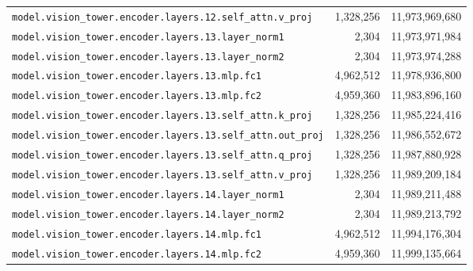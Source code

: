 \documentclass[10pt,a4paper]{article}
\theoremstyle{definition}
\begin{document}
\begin{appendices}
\begin{longtable}{p{9.5cm}rr}
\texttt{model.\allowbreak{}vision\_tower.\allowbreak{}encoder.\allowbreak{}layers.\allowbreak{}12.\allowbreak{}self\_attn.\allowbreak{}v\_proj} & 1,328,256 & 11,973,969,680 \\
\texttt{model.\allowbreak{}vision\_tower.\allowbreak{}encoder.\allowbreak{}layers.\allowbreak{}13.\allowbreak{}layer\_norm1} & 2,304 & 11,973,971,984 \\
\texttt{model.\allowbreak{}vision\_tower.\allowbreak{}encoder.\allowbreak{}layers.\allowbreak{}13.\allowbreak{}layer\_norm2} & 2,304 & 11,973,974,288 \\
\texttt{model.\allowbreak{}vision\_tower.\allowbreak{}encoder.\allowbreak{}layers.\allowbreak{}13.\allowbreak{}mlp.\allowbreak{}fc1} & 4,962,512 & 11,978,936,800 \\
\texttt{model.\allowbreak{}vision\_tower.\allowbreak{}encoder.\allowbreak{}layers.\allowbreak{}13.\allowbreak{}mlp.\allowbreak{}fc2} & 4,959,360 & 11,983,896,160 \\
\texttt{model.\allowbreak{}vision\_tower.\allowbreak{}encoder.\allowbreak{}layers.\allowbreak{}13.\allowbreak{}self\_attn.\allowbreak{}k\_proj} & 1,328,256 & 11,985,224,416 \\
\texttt{model.\allowbreak{}vision\_tower.\allowbreak{}encoder.\allowbreak{}layers.\allowbreak{}13.\allowbreak{}self\_attn.\allowbreak{}out\_proj} & 1,328,256 & 11,986,552,672 \\
\texttt{model.\allowbreak{}vision\_tower.\allowbreak{}encoder.\allowbreak{}layers.\allowbreak{}13.\allowbreak{}self\_attn.\allowbreak{}q\_proj} & 1,328,256 & 11,987,880,928 \\
\texttt{model.\allowbreak{}vision\_tower.\allowbreak{}encoder.\allowbreak{}layers.\allowbreak{}13.\allowbreak{}self\_attn.\allowbreak{}v\_proj} & 1,328,256 & 11,989,209,184 \\
\texttt{model.\allowbreak{}vision\_tower.\allowbreak{}encoder.\allowbreak{}layers.\allowbreak{}14.\allowbreak{}layer\_norm1} & 2,304 & 11,989,211,488 \\
\texttt{model.\allowbreak{}vision\_tower.\allowbreak{}encoder.\allowbreak{}layers.\allowbreak{}14.\allowbreak{}layer\_norm2} & 2,304 & 11,989,213,792 \\
\texttt{model.\allowbreak{}vision\_tower.\allowbreak{}encoder.\allowbreak{}layers.\allowbreak{}14.\allowbreak{}mlp.\allowbreak{}fc1} & 4,962,512 & 11,994,176,304 \\
\texttt{model.\allowbreak{}vision\_tower.\allowbreak{}encoder.\allowbreak{}layers.\allowbreak{}14.\allowbreak{}mlp.\allowbreak{}fc2} & 4,959,360 & 11,999,135,664 \\

\end{longtable}
\end{appendices}
\end{document}
